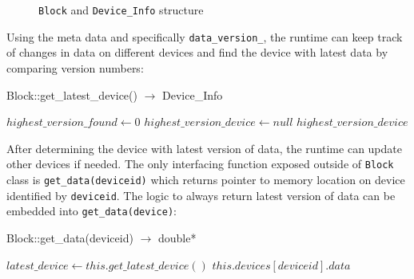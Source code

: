 \begin{figure}[h]
  \caption{\texttt{Block} and \texttt{Device\_Info} structure}\label{fig:Device\_Info\_Structure}
\end{figure}

Using the meta data and specifically \texttt{data\_version\_}, the runtime can keep
track of changes in data on different devices and find the device with latest
data by comparing version numbers:

\begin{algorithm} {Block::get\_latest\_device() $\rightarrow$ Device\_Info}
  \singlespacing

  \begin{algorithmic}[1]
    \State $highest\_version\_found \gets 0$
    \State $highest\_version\_device \gets null$
    \EndIf
    \EndFor
    \State \Return $highest\_version\_device$
    \EndFunction
  \end{algorithmic}
\end{algorithm}

After determining the device with latest version of data, the runtime can update
other devices if needed. The only interfacing function exposed outside of
\texttt{Block} class is \texttt{get\_data(deviceid)} which returns pointer to memory
location on device identified by \texttt{deviceid}. The logic to always return
latest version of data can be embedded into \texttt{get\_data(device)}:

\begin{algorithm}  {Block::get\_data(deviceid) $\rightarrow$ double*}
  \singlespacing

  \begin{algorithmic}[1]
    \State $latest\_device \gets this.get\_latest\_device()$
    \EndIf
    \State \Return $this.devices[deviceid].data$
    \EndFunction
  \end{algorithmic}
  \label{alg:get_data}
\end{algorithm}

